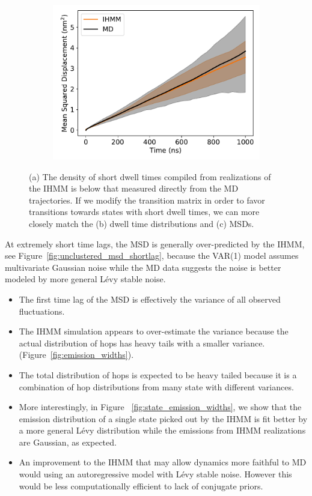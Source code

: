 \documentclass[journal=jpcbfk,manuscript=article]{achemso}
\begin{document}
\begin{figure}
\begin{subfigure}{0.32\textwidth}
  \includegraphics[width=\textwidth]{unclustered_msd_MET_modT.pdf}
  \caption{}\label{fig:msd_modT}
  \end{subfigure}
  \caption{(a) The density of short dwell times compiled from realizations of
  the IHMM is below that measured directly from the MD trajectories. If we
  modify the transition matrix in order to favor transitions towards states with
  short dwell times, we can more closely match the (b) dwell time distributions
  and (c) MSDs.}\label{fig:slow_T}
  \end{figure}
  
  At extremely short time lags, the MSD is generally over-predicted by the IHMM,
  see Figure~\ref{fig:unclustered_msd_shortlag}, because the VAR(1) model assumes
  multivariate Gaussian noise while the MD data suggests the noise is better 
  modeled by more general L\'evy stable noise.
  \begin{itemize}
    \item The first time lag of the MSD is effectively the variance of all 
    observed fluctuations. 
    \item The IHMM simulation appears to over-estimate the variance because the 
    actual distribution of hops has heavy tails with a smaller variance. (Figure~\ref{fig:emission_widths}).
    \item The total distribution of hops is expected to be heavy tailed because
    it is a combination of hop distributions from many state with different variances. 
    \item More interestingly, in Figure ~\ref{fig:state_emission_widths}, we show that
    the emission distribution of a single state picked out by the IHMM is fit better by
    a more general L\'evy distribution while the emissions from IHMM realizations are
    Gaussian, as expected.
    \item An improvement to the IHMM that may allow dynamics more faithful to MD would
    using an autoregressive model with L\'evy stable noise. However this would be 
    less computationally efficient to lack of conjugate priors.
  \end{itemize}
  
\end{document}
